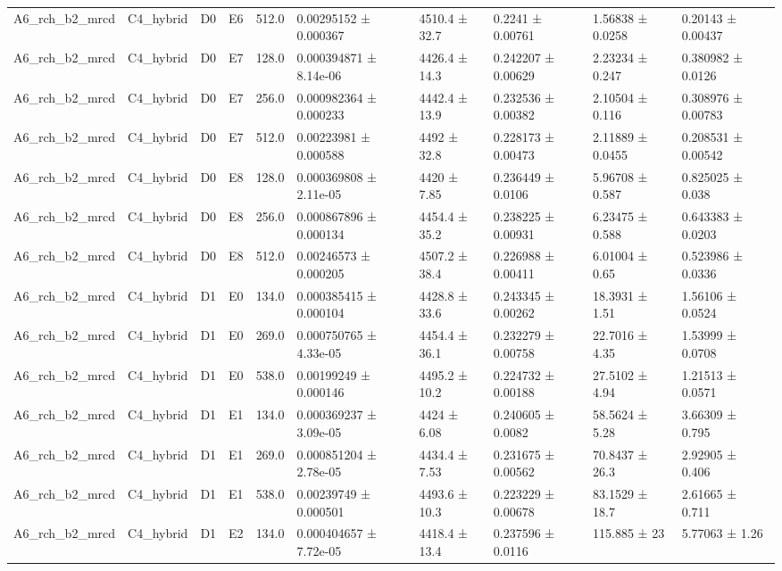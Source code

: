 \begin{table}
\begin{tabular}{llllllllll}
A6\_rch\_b2\_mrcd & C4\_hybrid & D0 & E6 & 512.0 & 0.00295152 ± 0.000367 & 4510.4 ± 32.7 & 0.2241 ± 0.00761 & 1.56838 ± 0.0258 & 0.20143 ± 0.00437 \\
A6\_rch\_b2\_mrcd & C4\_hybrid & D0 & E7 & 128.0 & 0.000394871 ± 8.14e-06 & 4426.4 ± 14.3 & 0.242207 ± 0.00629 & 2.23234 ± 0.247 & 0.380982 ± 0.0126 \\
A6\_rch\_b2\_mrcd & C4\_hybrid & D0 & E7 & 256.0 & 0.000982364 ± 0.000233 & 4442.4 ± 13.9 & 0.232536 ± 0.00382 & 2.10504 ± 0.116 & 0.308976 ± 0.00783 \\
A6\_rch\_b2\_mrcd & C4\_hybrid & D0 & E7 & 512.0 & 0.00223981 ± 0.000588 & 4492 ± 32.8 & 0.228173 ± 0.00473 & 2.11889 ± 0.0455 & 0.208531 ± 0.00542 \\
A6\_rch\_b2\_mrcd & C4\_hybrid & D0 & E8 & 128.0 & 0.000369808 ± 2.11e-05 & 4420 ± 7.85 & 0.236449 ± 0.0106 & 5.96708 ± 0.587 & 0.825025 ± 0.038 \\
A6\_rch\_b2\_mrcd & C4\_hybrid & D0 & E8 & 256.0 & 0.000867896 ± 0.000134 & 4454.4 ± 35.2 & 0.238225 ± 0.00931 & 6.23475 ± 0.588 & 0.643383 ± 0.0203 \\
A6\_rch\_b2\_mrcd & C4\_hybrid & D0 & E8 & 512.0 & 0.00246573 ± 0.000205 & 4507.2 ± 38.4 & 0.226988 ± 0.00411 & 6.01004 ± 0.65 & 0.523986 ± 0.0336 \\
A6\_rch\_b2\_mrcd & C4\_hybrid & D1 & E0 & 134.0 & 0.000385415 ± 0.000104 & 4428.8 ± 33.6 & 0.243345 ± 0.00262 & 18.3931 ± 1.51 & 1.56106 ± 0.0524 \\
A6\_rch\_b2\_mrcd & C4\_hybrid & D1 & E0 & 269.0 & 0.000750765 ± 4.33e-05 & 4454.4 ± 36.1 & 0.232279 ± 0.00758 & 22.7016 ± 4.35 & 1.53999 ± 0.0708 \\
A6\_rch\_b2\_mrcd & C4\_hybrid & D1 & E0 & 538.0 & 0.00199249 ± 0.000146 & 4495.2 ± 10.2 & 0.224732 ± 0.00188 & 27.5102 ± 4.94 & 1.21513 ± 0.0571 \\
A6\_rch\_b2\_mrcd & C4\_hybrid & D1 & E1 & 134.0 & 0.000369237 ± 3.09e-05 & 4424 ± 6.08 & 0.240605 ± 0.0082 & 58.5624 ± 5.28 & 3.66309 ± 0.795 \\
A6\_rch\_b2\_mrcd & C4\_hybrid & D1 & E1 & 269.0 & 0.000851204 ± 2.78e-05 & 4434.4 ± 7.53 & 0.231675 ± 0.00562 & 70.8437 ± 26.3 & 2.92905 ± 0.406 \\
A6\_rch\_b2\_mrcd & C4\_hybrid & D1 & E1 & 538.0 & 0.00239749 ± 0.000501 & 4493.6 ± 10.3 & 0.223229 ± 0.00678 & 83.1529 ± 18.7 & 2.61665 ± 0.711 \\
A6\_rch\_b2\_mrcd & C4\_hybrid & D1 & E2 & 134.0 & 0.000404657 ± 7.72e-05 & 4418.4 ± 13.4 & 0.237596 ± 0.0116 & 115.885 ± 23 & 5.77063 ± 1.26 \\

\end{tabular}
\end{table}
